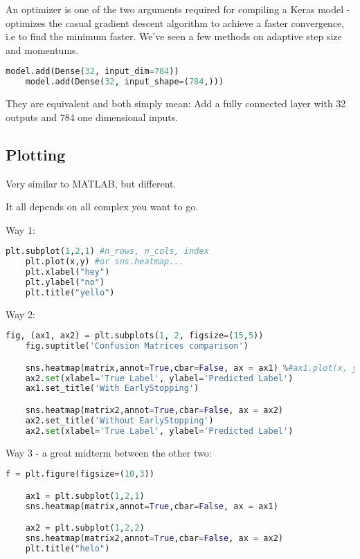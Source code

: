 An optimizer is one of the two arguments required for compiling a Keras model - optimizes the casual gradient descent algorithm to achieve a faster convergence, i.e to find the minimum faster. We've seen a few methods on adaptive step size and momentums.
\begin{lstlisting}[language=python]
    model.add(Dense(32, input_dim=784))
    model.add(Dense(32, input_shape=(784,)))    
\end{lstlisting}

They are equivalent and both simply mean: Add a fully connected layer with 32 outputs and 784 one dimensional inputs.



\subsection{Plotting}

Very similar to MATLAB, but different.


It all depends on all complex you want to go.

Way 1:
\begin{lstlisting}[language=python]
    plt.subplot(1,2,1) #n_rows, n_cols, index
    plt.plot(x,y) #or sns.heatmap...
    plt.xlabel("hey")
    plt.ylabel("no")
    plt.title("yello")
\end{lstlisting}


Way 2:
\begin{lstlisting}[language=python]
    fig, (ax1, ax2) = plt.subplots(1, 2, figsize=(15,5))
    fig.suptitle('Confusion Matrices comparison')

    sns.heatmap(matrix,annot=True,cbar=False, ax = ax1) %#ax1.plot(x, y)
    ax2.set(xlabel='True Label', ylabel='Predicted Label')
    ax1.set_title('With EarlyStopping')

    sns.heatmap(matrix2,annot=True,cbar=False, ax = ax2)
    ax2.set_title('Without EarlyStopping')
    ax2.set(xlabel='True Label', ylabel='Predicted Label')
\end{lstlisting}


Way 3 - a great midterm between the other two:
\begin{lstlisting}[language=python]
    f = plt.figure(figsize=(10,3))

    ax1 = plt.subplot(1,2,1)
    sns.heatmap(matrix,annot=True,cbar=False, ax = ax1)

    ax2 = plt.subplot(1,2,2)
    sns.heatmap(matrix2,annot=True,cbar=False, ax = ax2)
    plt.title("helo")    
\end{lstlisting}




